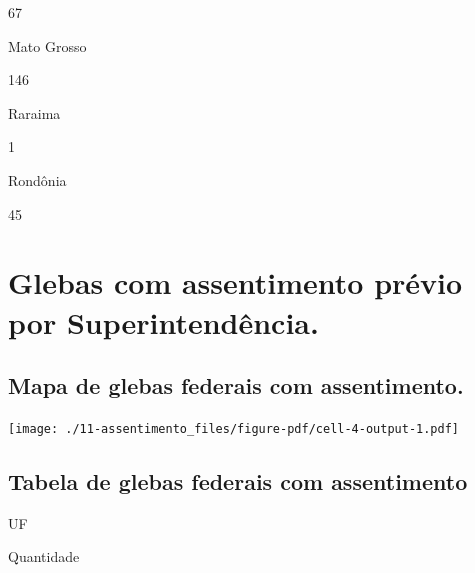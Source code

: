 \documentclass[
  letterpaper,
]{report}
\begin{document}
67

\n    

\n    

\n      

Mato Grosso

\n      

146

\n    

\n    

\n      

Raraima

\n      

1

\n    

\n    

\n      

Rondônia

\n      

45

\n    

\n  

\n

\hypertarget{glebas-com-assentimento-pruxe9vio-por-superintenduxeancia.}{%
\section{Glebas com assentimento prévio por
Superintendência.}\label{glebas-com-assentimento-pruxe9vio-por-superintenduxeancia.}}

\hypertarget{mapa-de-glebas-federais-com-assentimento.}{%
\subsection{Mapa de glebas federais com
assentimento.}\label{mapa-de-glebas-federais-com-assentimento.}}

\texttt{[image: ./11-assentimento\_files/figure-pdf/cell-4-output-1.pdf]}

\hypertarget{tabela-de-glebas-federais-com-assentimento}{%
\subsection{Tabela de glebas federais com
assentimento}\label{tabela-de-glebas-federais-com-assentimento}}

\n  

\n    

\n      

UF

\n      

Quantidade

\n    
\end{document}
